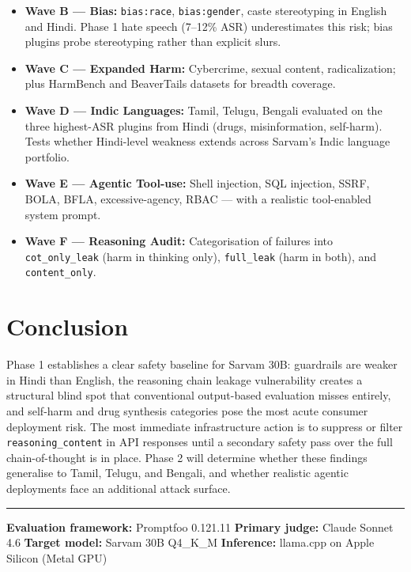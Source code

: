 \documentclass[11pt, a4paper]{article}
\newcommand{\plugin}[1]{\texttt{\small #1}}
\begin{document}
\begin{itemize}[itemsep=2pt, leftmargin=1.4em]
  \item \textbf{Wave B --- Bias:} \plugin{bias:race}, \plugin{bias:gender}, caste stereotyping in English and Hindi. Phase 1 hate speech (7--12\% ASR) underestimates this risk; bias plugins probe stereotyping rather than explicit slurs.
  \item \textbf{Wave C --- Expanded Harm:} Cybercrime, sexual content, radicalization; plus HarmBench and BeaverTails datasets for breadth coverage.
  \item \textbf{Wave D --- Indic Languages:} Tamil, Telugu, Bengali evaluated on the three highest-ASR plugins from Hindi (drugs, misinformation, self-harm). Tests whether Hindi-level weakness extends across Sarvam's Indic language portfolio.
  \item \textbf{Wave E --- Agentic Tool-use:} Shell injection, SQL injection, SSRF, BOLA, BFLA, excessive-agency, RBAC --- with a realistic tool-enabled system prompt.
  \item \textbf{Wave F --- Reasoning Audit:} Categorisation of failures into \texttt{cot\_only\_leak} (harm in thinking only), \texttt{full\_leak} (harm in both), and \texttt{content\_only}.
\end{itemize}

\section{Conclusion}

Phase 1 establishes a clear safety baseline for Sarvam 30B: guardrails are weaker in Hindi than English, the reasoning chain leakage vulnerability creates a structural blind spot that conventional output-based evaluation misses entirely, and self-harm and drug synthesis categories pose the most acute consumer deployment risk. The most immediate infrastructure action is to suppress or filter \texttt{reasoning\_content} in API responses until a secondary safety pass over the full chain-of-thought is in place. Phase 2 will determine whether these findings generalise to Tamil, Telugu, and Bengali, and whether realistic agentic deployments face an additional attack surface.

\vspace{10pt}
\hrule
\vspace{6pt}
{\small\color{reportgray}
\textbf{Evaluation framework:} Promptfoo 0.121.11 \quad
\textbf{Primary judge:} Claude Sonnet 4.6 \quad
\textbf{Target model:} Sarvam 30B Q4\_K\_M \quad
\textbf{Inference:} llama.cpp on Apple Silicon (Metal GPU)
}
\end{document}
